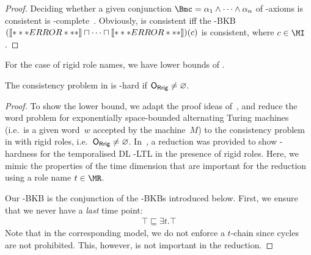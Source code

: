 \begin{proof}
  Deciding whether a given conjunction $\B = \alpha_{1} \land \dots \land \alpha_{n}$ of \ALCOIQ-axioms
  is consistent is \NExpTime-complete~\cite{Tob-JAIR00}.  Obviously, \B is consistent iff the \ELSHOIQ-BKB
  $(\oax{\alpha_{1}} \sqcap \dots \sqcap \oax{\alpha_{n}})(c)$ is consistent, where $c\in\MI$.
\end{proof}

\noindent
For the case of rigid role names, we have lower bounds of \TwoExpTime.

\begin{theorem}\label{thm:elalc-2exp-hard-rigid-roles}
  The consistency problem in \ELALC is \TwoExpTime-hard if $\ORR \neq \emptyset$.
\end{theorem}

\begin{proof}
  To show the lower bound, we adapt the proof ideas of~\cite{BaGL-KR08,BaGL-ToCL12}, and reduce the
  word problem for exponentially space-bounded alternating Turing machines (i.e.~is a given word~$w$
  accepted by the machine~$M$) to the consistency problem in \ELALC with rigid roles,
  i.e.~$\ORR\ne\emptyset$.
  In~\cite{BaGL-KR08,BaGL-ToCL12}, a reduction was provided to show \TwoExpTime-hardness for the
  temporalised DL \ALC-LTL in the presence of rigid roles.
  Here, we mimic the properties of the time dimension that are important for the reduction using a
  role name $t\in\MR$.

  Our \ELALC-BKB is the conjunction of the \ELALC-BKBs introduced below.
  First, we ensure that we never have a \emph{last} time point:
  \begin{gather*}
    \top\sqsubseteq\exists t.\top
  \end{gather*}
  Note that in the corresponding model, we do not enforce a $t$-chain since cycles are not
  prohibited.  This, however, is not important in the reduction.


\end{proof}
